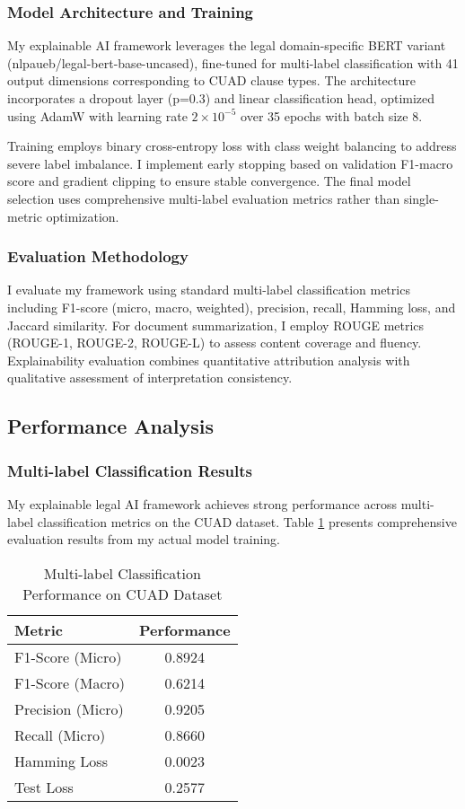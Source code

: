 \subsubsection{Model Architecture and Training}
My explainable AI framework leverages the legal domain-specific BERT variant (nlpaueb/legal-bert-base-uncased), fine-tuned for multi-label classification with 41 output dimensions corresponding to CUAD clause types. The architecture incorporates a dropout layer (p=0.3) and linear classification head, optimized using AdamW with learning rate $2 \times 10^{-5}$ over 35 epochs with batch size 8.

Training employs binary cross-entropy loss with class weight balancing to address severe label imbalance. I implement early stopping based on validation F1-macro score and gradient clipping to ensure stable convergence. The final model selection uses comprehensive multi-label evaluation metrics rather than single-metric optimization.

\subsubsection{Evaluation Methodology}
I evaluate my framework using standard multi-label classification metrics including F1-score (micro, macro, weighted), precision, recall, Hamming loss, and Jaccard similarity. For document summarization, I employ ROUGE metrics (ROUGE-1, ROUGE-2, ROUGE-L) to assess content coverage and fluency. Explainability evaluation combines quantitative attribution analysis with qualitative assessment of interpretation consistency.

\subsection{Performance Analysis}
\label{subsec:performance_analysis}

\subsubsection{Multi-label Classification Results}
My explainable legal AI framework achieves strong performance across multi-label classification metrics on the CUAD dataset. Table \ref{tab:classification_results} presents comprehensive evaluation results from my actual model training.

\begin{table}[ht]
\centering
\caption{Multi-label Classification Performance on CUAD Dataset}
\label{tab:classification_results}
\begin{tabular}{|l|c|}
\hline
\textbf{Metric} & \textbf{Performance} \\
\hline
F1-Score (Micro) & 0.8924 \\
F1-Score (Macro) & 0.6214 \\
Precision (Micro) & 0.9205 \\
Recall (Micro) & 0.8660 \\
Hamming Loss & 0.0023 \\
Test Loss & 0.2577 \\
\hline
\end{tabular}
\end{table}

